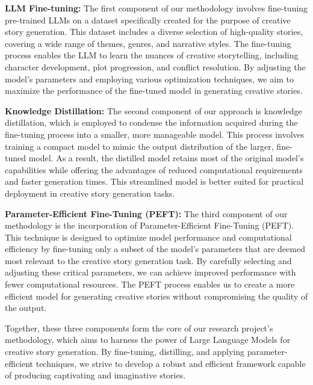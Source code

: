 \documentclass[letterpaper]{article}
\begin{document}
\textbf{LLM Fine-tuning:} The first component of our methodology involves fine-tuning pre-trained LLMs on a dataset specifically created for the purpose of creative story generation. This dataset includes a diverse selection of high-quality stories, covering a wide range of themes, genres, and narrative styles. The fine-tuning process enables the LLM to learn the nuances of creative storytelling, including character development, plot progression, and conflict resolution. By adjusting the model's parameters and employing various optimization techniques, we aim to maximize the performance of the fine-tuned model in generating creative stories.

\textbf{Knowledge Distillation:} The second component of our approach is knowledge distillation, which is employed to condense the information acquired during the fine-tuning process into a smaller, more manageable model. This process involves training a compact model to mimic the output distribution of the larger, fine-tuned model. As a result, the distilled model retains most of the original model's capabilities while offering the advantages of reduced computational requirements and faster generation times. This streamlined model is better suited for practical deployment in creative story generation tasks.

\textbf{Parameter-Efficient Fine-Tuning (PEFT):} The third component of our methodology is the incorporation of Parameter-Efficient Fine-Tuning (PEFT). This technique is designed to optimize model performance and computational efficiency by fine-tuning only a subset of the model's parameters that are deemed most relevant to the creative story generation task. By carefully selecting and adjusting these critical parameters, we can achieve improved performance with fewer computational resources. The PEFT process enables us to create a more efficient model for generating creative stories without compromising the quality of the output.

Together, these three components form the core of our research project's methodology, which aims to harness the power of Large Language Models for creative story generation. By fine-tuning, distilling, and applying parameter-efficient techniques, we strive to develop a robust and efficient framework capable of producing captivating and imaginative stories.
\end{document}
